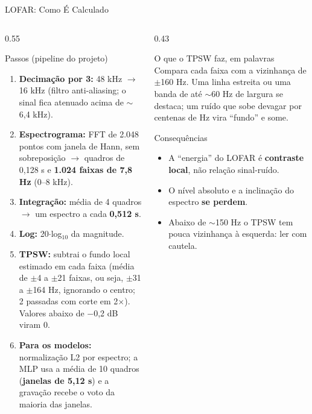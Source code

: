 \documentclass[aspectratio=169]{beamer}
\begin{document}
\begin{frame}{LOFAR: Como É Calculado}
    \footnotesize
    \begin{columns}[T]
        \begin{column}{0.55\textwidth}
            \begin{block}{\small Passos (pipeline do projeto)}
                \scriptsize
                \begin{enumerate}
                    \setlength{\itemsep}{1pt}
                    \item \textbf{Decimação por 3:} 48 kHz $\to$ 16 kHz (filtro anti-aliasing; o sinal fica atenuado acima de $\sim$6,4 kHz).
                    \item \textbf{Espectrograma:} FFT de 2.048 pontos com janela de Hann, sem sobreposição $\to$ quadros de 0,128 s e \textbf{1.024 faixas de 7,8 Hz} (0--8 kHz).
                    \item \textbf{Integração:} média de 4 quadros $\to$ um espectro a cada \textbf{0,512 s}.
                    \item \textbf{Log:} 20$\cdot$log$_{10}$ da magnitude.
                    \item \textbf{TPSW:} subtrai o fundo local estimado em cada faixa (média de $\pm$4 a $\pm$21 faixas, ou seja, $\pm$31 a $\pm$164 Hz, ignorando o centro; 2 passadas com corte em 2$\times$). Valores abaixo de $-$0,2 dB viram 0.
                    \item \textbf{Para os modelos:} normalização L2 por espectro; a MLP usa a média de 10 quadros (\textbf{janelas de 5,12 s}) e a gravação recebe o voto da maioria das janelas.
                \end{enumerate}
            \end{block}
        \end{column}
        \begin{column}{0.43\textwidth}
            \begin{block}{\small O que o TPSW faz, em palavras}
                \scriptsize
                Compara cada faixa com a vizinhança de $\pm$160 Hz. Uma linha estreita ou uma banda de até $\sim$60 Hz de largura se destaca; um ruído que sobe devagar por centenas de Hz vira ``fundo'' e some.
            \end{block}
            \begin{block}{\small Consequências}
                \scriptsize
                \begin{itemize}
                    \setlength{\itemsep}{1pt}
                    \item A ``energia'' do LOFAR é \textbf{contraste local}, não relação sinal-ruído.
                    \item O nível absoluto e a inclinação do espectro \textbf{se perdem}.
                    \item Abaixo de $\sim$150 Hz o TPSW tem pouca vizinhança à esquerda: ler com cautela.
                \end{itemize}
            \end{block}
        \end{column}
    \end{columns}
\end{frame}
\end{document}
